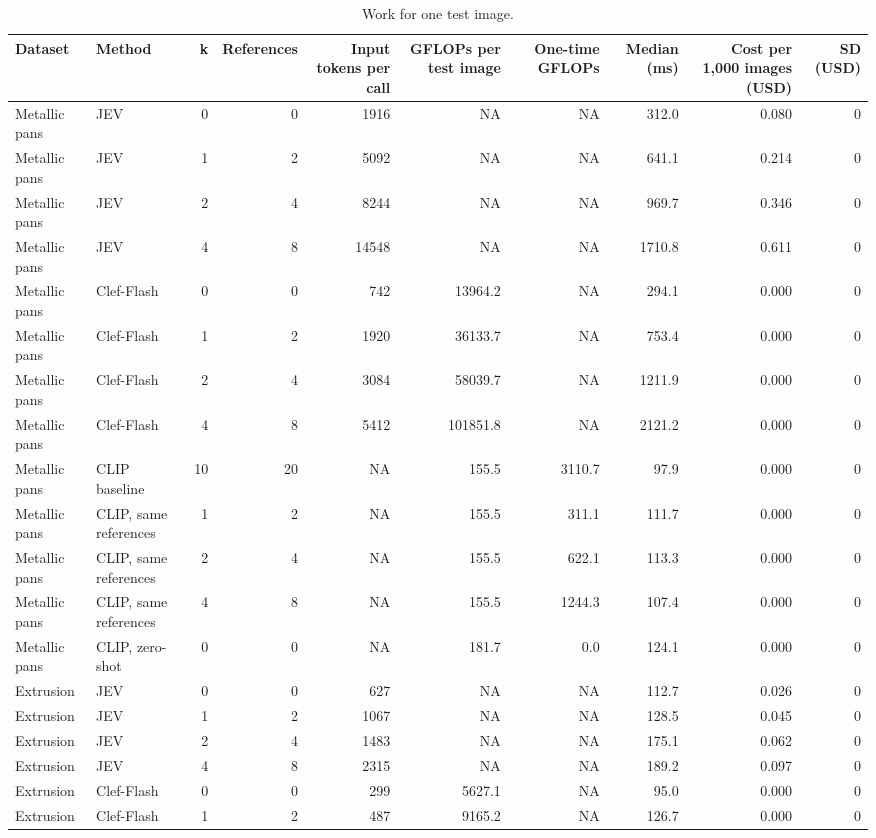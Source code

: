 \begin{table}

\caption{\label{tab:tbl-compute-work}Work for one test image.}
\centering
\begin{tabular}[t]{llrrrrrrrr}
\toprule
Dataset & Method & k & References & Input tokens per call & GFLOPs per test image & One-time GFLOPs & Median (ms) & Cost per 1,000 images (USD) & SD (USD)\\
\midrule
Metallic pans & JEV & 0 & 0 & 1916 & NA & NA & 312.0 & 0.080 & 0\\
Metallic pans & JEV & 1 & 2 & 5092 & NA & NA & 641.1 & 0.214 & 0\\
Metallic pans & JEV & 2 & 4 & 8244 & NA & NA & 969.7 & 0.346 & 0\\
Metallic pans & JEV & 4 & 8 & 14548 & NA & NA & 1710.8 & 0.611 & 0\\
Metallic pans & Clef-Flash & 0 & 0 & 742 & 13964.2 & NA & 294.1 & 0.000 & 0\\
\addlinespace
Metallic pans & Clef-Flash & 1 & 2 & 1920 & 36133.7 & NA & 753.4 & 0.000 & 0\\
Metallic pans & Clef-Flash & 2 & 4 & 3084 & 58039.7 & NA & 1211.9 & 0.000 & 0\\
Metallic pans & Clef-Flash & 4 & 8 & 5412 & 101851.8 & NA & 2121.2 & 0.000 & 0\\
Metallic pans & CLIP baseline & 10 & 20 & NA & 155.5 & 3110.7 & 97.9 & 0.000 & 0\\
Metallic pans & CLIP, same references & 1 & 2 & NA & 155.5 & 311.1 & 111.7 & 0.000 & 0\\
\addlinespace
Metallic pans & CLIP, same references & 2 & 4 & NA & 155.5 & 622.1 & 113.3 & 0.000 & 0\\
Metallic pans & CLIP, same references & 4 & 8 & NA & 155.5 & 1244.3 & 107.4 & 0.000 & 0\\
Metallic pans & CLIP, zero-shot & 0 & 0 & NA & 181.7 & 0.0 & 124.1 & 0.000 & 0\\
Extrusion & JEV & 0 & 0 & 627 & NA & NA & 112.7 & 0.026 & 0\\
Extrusion & JEV & 1 & 2 & 1067 & NA & NA & 128.5 & 0.045 & 0\\
\addlinespace
Extrusion & JEV & 2 & 4 & 1483 & NA & NA & 175.1 & 0.062 & 0\\
Extrusion & JEV & 4 & 8 & 2315 & NA & NA & 189.2 & 0.097 & 0\\
Extrusion & Clef-Flash & 0 & 0 & 299 & 5627.1 & NA & 95.0 & 0.000 & 0\\
Extrusion & Clef-Flash & 1 & 2 & 487 & 9165.2 & NA & 126.7 & 0.000 & 0\\

\end{tabular}
\end{table}
